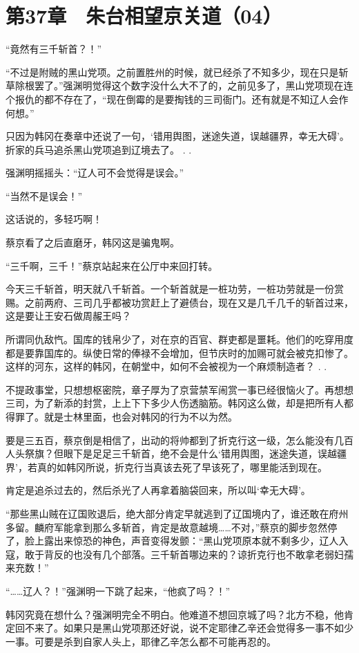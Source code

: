 \section{第37章　朱台相望京关道（04）}

“竟然有三千斩首？！”

“不过是附贼的黑山党项。之前置胜州的时候，就已经杀了不知多少，现在只是斩草除根罢了。”强渊明觉得这个数字没什么大不了的，之前见多了，黑山党项现在连个报仇的都不存在了，“现在倒霉的是要掏钱的三司衙门。还有就是不知辽人会作何想。”

只因为韩冈在奏章中还说了一句，‘错用舆图，迷途失道，误越疆界，幸无大碍’。折家的兵马追杀黑山党项追到辽境去了。 . .

强渊明摇摇头：“辽人可不会觉得是误会。”

“当然不是误会！”

这话说的，多轻巧啊！

蔡京看了之后直磨牙，韩冈这是骗鬼啊。

“三千啊，三千！”蔡京站起来在公厅中来回打转。

今天三千斩首，明天就八千斩首。一个斩首就是一桩功劳，一桩功劳就是一份赏赐。之前两府、三司几乎都被功赏赶上了避债台，现在又是几千几千的斩首过来，这是要让王安石做周赧王吗？

所谓同仇敌忾。国库的钱帛少了，对在京的百官、群吏都是噩耗。他们的吃穿用度都是要靠国库的。纵使日常的俸禄不会增加，但节庆时的加赐可就会被克扣惨了。这样的河东，这样的韩冈，在朝堂中，如何不会被视为一个麻烦制造者？ . .

不提政事堂，只想想枢密院，章子厚为了京营禁军闹赏一事已经很恼火了。再想想三司，为了新添的封赏，上上下下多少人伤透脑筋。韩冈这么做，却是把所有人都得罪了。就是士林里面，也会对韩冈的行为不以为然。

要是三五百，蔡京倒是相信了，出动的将帅都到了折克行这一级，怎么能没有几百人头祭旗？但眼下是足足三千斩首，绝不会是什么‘错用舆图，迷途失道，误越疆界’，若真的如韩冈所说，折克行当真该去死了早该死了，哪里能活到现在。

肯定是追杀过去的，然后杀光了人再拿着脑袋回来，所以叫‘幸无大碍’。

“那些黑山贼在辽国败退后，绝大部分肯定早就逃到了辽国境内了，谁还敢在府州多留。麟府军能拿到那么多斩首，肯定是故意越境……不对，”蔡京的脚步忽然停了，脸上露出来惊恐的神色，声音变得发颤：“黑山党项原本就不剩多少，辽人入寇，敢于背反的也没有几个部落。三千斩首哪边来的？谅折克行也不敢拿老弱妇孺来充数！”

“……辽人？！”强渊明一下跳了起来，“他疯了吗？！”

韩冈究竟在想什么？强渊明完全不明白。他难道不想回京城了吗？北方不稳，他肯定回不来了。如果只是黑山党项那还好说，说不定耶律乙辛还会觉得多一事不如少一事。可要是杀到自家人头上，耶律乙辛怎么都不可能再忍的。

